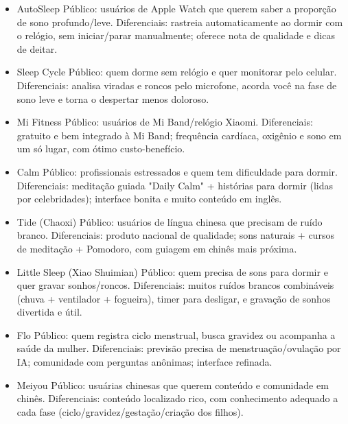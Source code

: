 
\begin{itemize}
  \item AutoSleep Público: usuários de Apple Watch que querem saber a proporção de sono profundo/leve. Diferenciais: rastreia automaticamente ao dormir com o relógio, sem iniciar/parar manualmente; oferece nota de qualidade e dicas de deitar.
  \item Sleep Cycle Público: quem dorme sem relógio e quer monitorar pelo celular. Diferenciais: analisa viradas e roncos pelo microfone, acorda você na fase de sono leve e torna o despertar menos doloroso.
  \item Mi Fitness Público: usuários de Mi Band/relógio Xiaomi. Diferenciais: gratuito e bem integrado à Mi Band; frequência cardíaca, oxigênio e sono em um só lugar, com ótimo custo-benefício.
\end{itemize}


\begin{itemize}
  \item Calm Público: profissionais estressados e quem tem dificuldade para dormir. Diferenciais: meditação guiada "Daily Calm" + histórias para dormir (lidas por celebridades); interface bonita e muito conteúdo em inglês.
  \item Tide (Chaoxi) Público: usuários de língua chinesa que precisam de ruído branco. Diferenciais: produto nacional de qualidade; sons naturais + cursos de meditação + Pomodoro, com guiagem em chinês mais próxima.
  \item Little Sleep (Xiao Shuimian) Público: quem precisa de sons para dormir e quer gravar sonhos/roncos. Diferenciais: muitos ruídos brancos combináveis (chuva + ventilador + fogueira), timer para desligar, e gravação de sonhos divertida e útil.
\end{itemize}


\begin{itemize}
  \item Flo Público: quem registra ciclo menstrual, busca gravidez ou acompanha a saúde da mulher. Diferenciais: previsão precisa de menstruação/ovulação por IA; comunidade com perguntas anônimas; interface refinada.
  \item Meiyou Público: usuárias chinesas que querem conteúdo e comunidade em chinês. Diferenciais: conteúdo localizado rico, com conhecimento adequado a cada fase (ciclo/gravidez/gestação/criação dos filhos).
\end{itemize}


